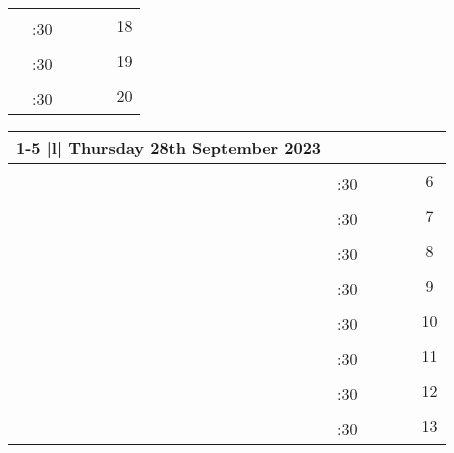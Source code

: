 \documentclass[10pt, a5paper, final, oneside]{memoir}
\newcommand{\grayline}{\arrayrulecolor{lightgray}\cline{1-5}\arrayrulecolor{black}}
\begin{document}
\begin{tabularx}{\linewidth}{|c|c|X|X|X|c}
    & & & && \multirow{2}{*}{18}\\ 
    \grayline
    & :30 & & &&\\ \hline

    & & & && \multirow{2}{*}{19}\\ 
    \grayline
    & :30 & & &&\\ \hline
    
    & & & && \multirow{2}{*}{20}\\ 
    \grayline
    & :30 & & &&\\ \hline

\end{tabularx}

\newpage

\noindent
\begin{tabularx}{\linewidth}{|c|c|X|X|X|c}

    \cline{1-5}
    \multicolumn{5} {|l|} {Thursday 28th September 2023} \\
    \hline

    & & & && \multirow{2}{*}{6}\\ 
    \grayline
    & :30 & & &&\\ \hline

    & & & && \multirow{2}{*}{7}\\ 
    \grayline
    & :30 & & &&\\ \hline

    & & & && \multirow{2}{*}{8}\\ 
    \grayline
    & :30 & & &&\\ \hline

    & & & && \multirow{2}{*}{9}\\ 
    \grayline
    & :30 & & &&\\ \hline
    
    & & & && \multirow{2}{*}{10}\\ 
    \grayline
    & :30 & & &&\\ \hline

    & & & && \multirow{2}{*}{11}\\ 
    \grayline
    & :30 & & &&\\ \hline

    & & & && \multirow{2}{*}{12}\\ 
    \grayline
    & :30 & & &&\\ \hline

    & & & && \multirow{2}{*}{13}\\ 
    \grayline
    & :30 & & &&\\ \hline


\end{tabularx}
\end{document}
